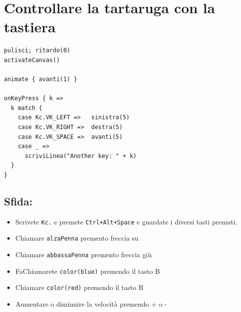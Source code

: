\chapter{Controllare la tartaruga con la tastiera}
\begin{multicols}{2}

\begin{lstlisting}[basicstyle={\ttfamily\fontsize{18}{22}\selectfont},numbers=none]
pulisci; ritardo(0)
activateCanvas()

animate { avanti(1) }

onKeyPress { k =>
  k match {
    case Kc.VK_LEFT =>   sinistra(5)
    case Kc.VK_RIGHT =>  destra(5)
    case Kc.VK_SPACE =>  avanti(5)
    case _ => 
      scriviLinea("Another key: " + k)
  }
}
\end{lstlisting}
        


\columnbreak


\section*{\color{BrickRed}Sfida:}


\begin{itemize}

\item {Scrivete \lstinline{Kc.} e premete \lstinline{Ctrl+Alt+Space} e guardate i diversi tasti premuti.}
\item {Chiamare \lstinline{alzaPenna} premento freccia su}
\item {Chiamare \lstinline{abbassaPenna} premento freccia giù}
\item {FaChiamarete \lstinline{color(blue)} premendo il tasto B}
\item {Chiamare \lstinline{color(red)} premendo il tasto R}
\item {Aumentare o diminuire la velocità premendo + o -}

\end{itemize}


\end{multicols}

